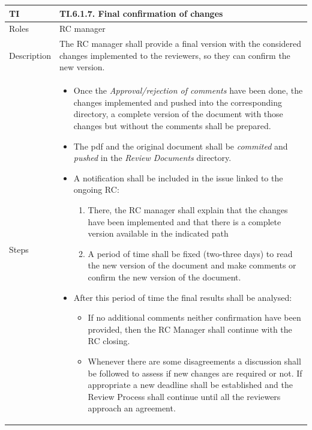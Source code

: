 \documentclass{template/openetcs_article}
\begin{document}
\begin{flushleft}
\tablefirsthead{}
\tablehead{}
\tabletail{}
\tablelasttail{}
\begin{supertabular}{|m{2cm}|m{13cm}|}
\hline
{}
TI & 
TI.6.1.7. Final confirmation of changes
\\\hline
Roles &
RC manager
\\\hline
Description &
The RC manager shall provide a final version with the considered changes implemented to the reviewers, so they can confirm the new version.  
\\\hline
Steps &
\begin{itemize}
\item Once the {\it Approval/rejection of comments} have been done, the changes implemented and pushed into the corresponding directory, a complete version of the document with those changes but without the comments shall be prepared.
\item The pdf and the original document shall be {\it commited} and {\it pushed} in the {\it Review Documents} directory.
\item A notification shall be included in the issue linked to the ongoing RC: 
\begin{enumerate}
\item There, the RC manager shall explain that the changes have been implemented and that there is a complete version available in the indicated path
\item A period of time shall be fixed (two-three days) to read the new version of the document and make comments or confirm the new version of the document.
\end{enumerate}
\item After this period of time the final results shall be analysed:
\begin{itemize}
\item If no additional comments neither confirmation have been provided, then the RC Manager shall continue with the RC closing.
\item Whenever there are some disagreements a discussion shall be followed to assess if new changes are required or not. If appropriate a new deadline shall be established and the Review Process shall continue until all the reviewers approach an agreement.
\end{itemize}
\end{itemize}
\\\hline
\end{supertabular}
\end{flushleft}
\end{document}
